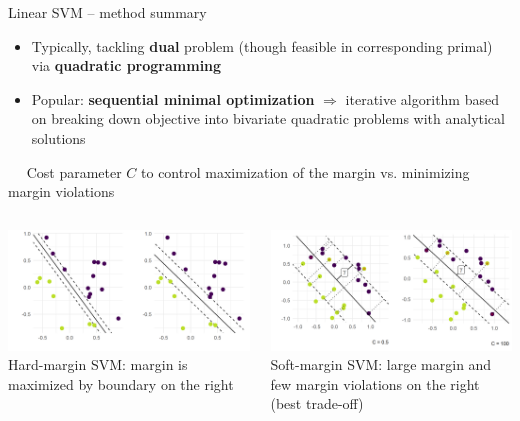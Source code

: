 \begin{vbframe}{Linear SVM -- method summary}
\begin{itemize}
  \item Typically, tackling \textbf{dual} problem (though feasible 
  in corresponding primal) via \textbf{quadratic programming}
  \item Popular: \textbf{sequential minimal optimization} $\Rightarrow$ 
  iterative algorithm based on breaking down objective into bivariate quadratic 
  problems with analytical solutions
\end{itemize}
\medskip

 ~~ Cost parameter \textbf{$C$} to control maximization of the margin vs. minimizing margin violations

\hfill
\begin{columns}
    \begin{column}{0.5\textwidth}
    \centering
        \includegraphics[width=\textwidth]{
  figure/linear_classif_2.png}  \\
  \tiny{Hard-margin SVM: margin is maximized by boundary on the right}
    \end{column}
    \begin{column}{0.5\textwidth}
    \centering
  \includegraphics[width=\textwidth]{
  figure/margin_violations.png}  \\
  \tiny{Soft-margin SVM: large margin and few margin violations on the right (best trade-off)}
    \end{column}
\end{columns}

  \normalsize

\end{vbframe}


